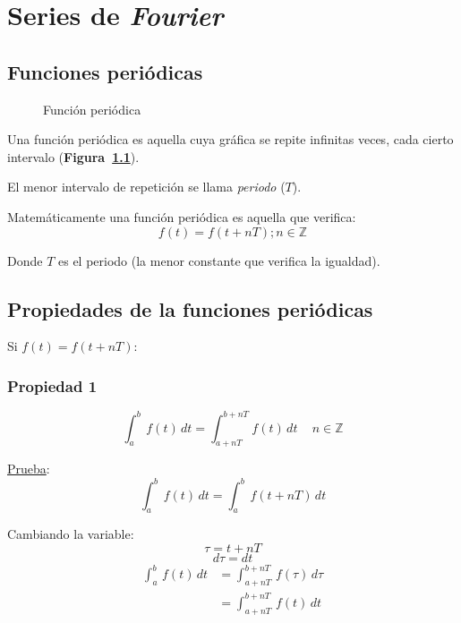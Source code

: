 \chapter{Series de \emph{Fourier}}

\section{Funciones periódicas}
\begin{figure}[H]
    \centering
    
    \caption{Función periódica}\label{figura_01}
\end{figure}

Una función periódica es aquella cuya gráfica se repite infinitas veces, cada
cierto intervalo (\textbf{Figura~\ref{figura_01}}).

El menor intervalo de repetición se llama \emph{periodo} ($T$).

Matemáticamente una función periódica es aquella que verifica:
\begin{equation}
    f(t)=f(t+nT);n\in\mathbb{Z}
\label{funcion_periodica}
\end{equation}

Donde $T$ es el periodo (la menor constante que verifica la igualdad).

\section{Propiedades de la funciones periódicas}
Si $f(t)=f(t+nT)$:
\subsection*{Propiedad 1}
\begin{equation}
    \int_a^b\,f(t)\,dt=\int_{a+nT}^{b+nT}f(t)\,dt\quad\,n\in\mathbb{Z}
\label{propiedad1}
\end{equation}

\underline{Prueba}:
\begin{equation*}
    \int_a^b\,f(t)\,dt=\int_{a}^{b}\,f(t+nT)\,dt
\end{equation*}

Cambiando la variable:
\begin{equation*}
    \tau=t+nT
\end{equation*}
\begin{equation*}
    d\tau=dt
\end{equation*}
\begin{equation*}
\begin{split}
    \int_a^b\,f(t)\,dt
        &=\int_{a+nT}^{b+nT}\,f(\tau)\,d\tau\\
        &=\int_{a+nT}^{b+nT}\,f(t)\,dt
\end{split}
\end{equation*}

